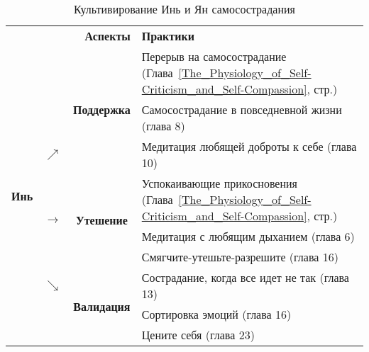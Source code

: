 \begin{table}[!h]
	\begin{center}
		\caption{Культивирование Инь и Ян самосострадания}\label{tab:Yin_and_Yang}
		\setlength{\extrarowheight}{1mm}
		\begin{tabular}{ccc||l}
			\multicolumn{3}{r||}{{\large\textbf{Аспекты}}} &{\large\textbf{Практики}}\\
			\cline{3-4}
			\multirow{9}{*}{{\huge\textbf{Инь}}} &  & \multirow{3}{*}{\textbf{Поддержка}} & Перерыв на самосострадание (Глава~\ref{The_Physiology_of_Self-Criticism_and_Self-Compassion}, стр.\:\pageref{IP:Self-Compassion_Break})\\ 
			&  &  & Самосострадание в повседневной жизни (глава 8)\\ 
			& $\nearrow$ &  & Медитация любящей доброты к себе (глава 10)\\ \cline{3-4}
			& \multirow{3}{*}{\textbf{$\rightarrow$}} & \multirow{3}{*}{\textbf{Утешение}} & Успокаивающие прикосновения (Глава~\ref{The_Physiology_of_Self-Criticism_and_Self-Compassion}, стр.\:\pageref{IP:Soothing_Touch})\\
			&   &   & Медитация с любящим дыханием (глава 6)\\
			&   &   & Смягчите-утешьте-разрешите (глава 16)\\ \cline{3-4}
			& $\searrow$ & \multirow{3}{*}{\textbf{Валидация}} & Сострадание, когда все идет не так (глава 13)\\
			&   &   & Сортировка эмоций (глава 16)\\
			&   &   & Цените себя (глава 23)\\ \cline{3-4}
		\end{tabular}
	\end{center}
\end{table} 
